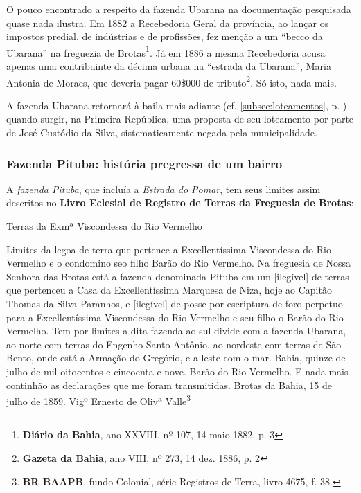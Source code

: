 O pouco encontrado a respeito da fazenda Ubarana na documentação pesquisada quase nada ilustra. Em 1882 a Recebedoria Geral da província, ao lançar os impostos predial, de indústrias e de profissões, fez menção a um ``becco da Ubarana'' na freguezia de Brotas\footnote{\textbf{Diário da Bahia}, ano XXVIII, nº 107, 14 maio 1882, p. 3}. Já em 1886 a mesma Recebedoria acusa apenas uma contribuinte da décima urbana na ``estrada da Ubarana'', Maria Antonia de Moraes, que deveria pagar 60\$000 de tributo\footnote{\textbf{Gazeta da Bahia}, ano VIII, nº 273, 14 dez. 1886, p. 2}. Só isto, nada mais.

A fazenda Ubarana retornará à baila mais adiante (cf. \autoref{subsec:loteamentos}, p. \pageref{subsec:loteamentos}) quando surgir, na Primeira República, uma proposta de seu loteamento por parte de José Custódio da Silva, sistematicamente negada pela municipalidade.

\subsubsection{Fazenda Pituba: história pregressa de um bairro}

A \textit{fazenda Pituba}, que incluía a \textit{Estrada do Pomar}, tem seus limites assim descritos no \textbf{Livro Eclesial de Registro de Terras da Freguesia de Brotas}:

\begin{citacao}
Terras da Exmª Viscondessa do Rio Vermelho

Limites da legoa de terra que pertence a Excellentíssima Viscondessa do Rio Vermelho e o condomino seo filho Barão do Rio Vermelho. Na freguesia de Nossa Senhora das Brotas está a fazenda denominada Pituba em um [ilegível] de terras que pertenceu a Casa da Excellentíssima Marquesa de Niza, hoje ao Capitão Thomas da Silva Paranhos, e [ilegível] de posse por escriptura de foro perpetuo para a Excellentíssima Viscondessa do Rio Vermelho e seu filho o Barão do Rio Vermelho. Tem por limites a dita fazenda ao sul divide com a fazenda Ubarana, ao norte com terras do Engenho Santo Antônio, ao nordeste com terras de São Bento, onde está a Armação do Gregório, e a leste com o mar. Bahia, quinze de julho de mil oitocentos e cincoenta e nove. Barão do Rio Vermelho. E nada mais continhão as declarações que me foram transmitidas. Brotas da Bahia, 15 de julho de 1859. Vigº Ernesto de Olivª Valle\footnote{\textbf{BR BAAPB}, fundo Colonial, série Registros de Terra, livro 4675, f. 38.}
\end{citacao}

